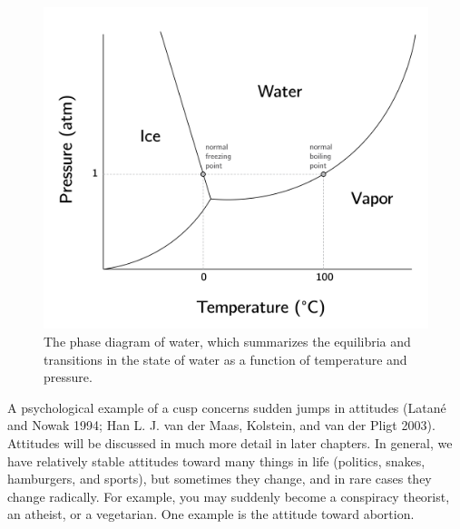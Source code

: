 \documentclass[
  a4paper,
  DIV=11,
  numbers=noendperiod]{scrreprt}
\begin{document}
\begin{figure}

{\centering \includegraphics{media/ch3/ch3-12__figure24.png}

}

\caption{\label{fig-ch3-img12-old-24}The phase diagram of water, which
summarizes the equilibria and transitions in the state of water as a
function of temperature and pressure.}

\end{figure}

A psychological example of a cusp concerns sudden jumps in attitudes
(Latané and Nowak 1994; Han L. J. van der Maas, Kolstein, and van der
Pligt 2003). Attitudes will be discussed in much more detail in later
chapters. In general, we have relatively stable attitudes toward many
things in life (politics, snakes, hamburgers, and sports), but sometimes
they change, and in rare cases they change radically. For example, you
may suddenly become a conspiracy theorist, an atheist, or a vegetarian.
One example is the attitude toward abortion.
\end{document}
